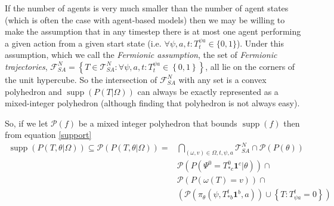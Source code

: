 \documentclass{article}
\DeclareMathOperator\supp{supp}
\begin{document}
If the number of agents is very much smaller than the number of agent states (which is often the case with agent-based models) then we may be willing to make the assumption that in any timestep there is at most one agent performing a given action from a given start state (i.e. $\forall \psi, a, t: T^{\psi a}_t \in \{0,1\}$). Under this assumption, which we call the \textit{Fermionic assumption}, the set of \textit{Fermionic trajectories}, $\mathcal{F}^N_{SA} = \left\{T\in\mathcal{T}^N_{SA}: \forall \psi, a, t: T^{\psi a}_t \in \left\{0,1\right\}\right\}$, all lie on the corners of the unit hypercube. So the intersection of $\mathcal{F}^N_{SA}$ with any set is a convex polyhedron and $\supp(P(T|\Omega))$ can always be exactly represented as a mixed-integer polyhedron (although finding that polyhedron is not always easy).

So, if we let $\mathcal{P}(f)$ be a mixed integer polyhedron that bounds $\supp(f)$ then from equation \eqref{support}
\begin{equation}
\begin{aligned}
\supp(P( T, \theta |\Omega)) \subseteq \mathcal{P}(P(T,\theta|\Omega)) =
& \bigcap_{(\omega,v) \in \Omega,t,\psi, a} \mathcal{T}^N_{SA} \cap \mathcal{P}(P(\theta)) \\
& \mathcal{P}(P(\Psi^0 = T^0_{* c}\mathbf{1}^c|\theta)) \cap\\
&    \mathcal{P}\left(P\left(\omega(T)=v\right)\right) \cap \\
& 
\left(\mathcal{P}\left(\pi_\theta(\psi,T^t_{* b}\mathbf{1}^b,a)\right)
\cup
\left\{T: T^t_{\psi a} = 0\right\}\right)
\\
\end{aligned}
\label{polyhedralSupport}
\end{equation}
\end{document}

